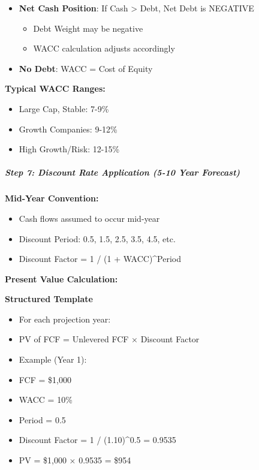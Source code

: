 \documentclass[11pt]{article}
\begin{document}
\begin{itemize}[leftmargin=*,itemsep=2pt,topsep=2pt]
\item {} \textbf{Net Cash Position}: If Cash > Debt, Net Debt is NEGATIVE
\begin{itemize}[leftmargin=*,itemsep=2pt,topsep=2pt]
\item {} Debt Weight may be negative
\item {} WACC calculation adjusts accordingly
\end{itemize}
\item {} \textbf{No Debt}: WACC = Cost of Equity
\end{itemize}

\textbf{Typical WACC Ranges:}

\begin{itemize}[leftmargin=*,itemsep=2pt,topsep=2pt]
\item {} Large Cap, Stable: 7-9\%
\item {} Growth Companies: 9-12\%
\item {} High Growth/Risk: 12-15\%
\end{itemize}

\subparagraph{Step 7: Discount Rate Application (5-10 Year Forecast)}\mbox{}\par

\textbf{Mid-Year Convention:}

\begin{itemize}[leftmargin=*,itemsep=2pt,topsep=2pt]
\item {} Cash flows assumed to occur mid-year
\item {} Discount Period: 0.5, 1.5, 2.5, 3.5, 4.5, etc.
\item {} Discount Factor = 1 / (1 + WACC)\textasciicircum{}Period
\end{itemize}

\textbf{Present Value Calculation:}

\textbf{Structured Template}
\begin{itemize}[leftmargin=*,itemsep=2pt,topsep=2pt]
\item {} For each projection year:
\item {} PV of FCF = Unlevered FCF × Discount Factor
\item {} Example (Year 1):
\item {} FCF = \$1,000
\item {} WACC = 10\%
\item {} Period = 0.5
\item {} Discount Factor = 1 / (1.10)\textasciicircum{}0.5 = 0.9535
\item {} PV = \$1,000 × 0.9535 = \$954
\end{itemize}
\end{document}
